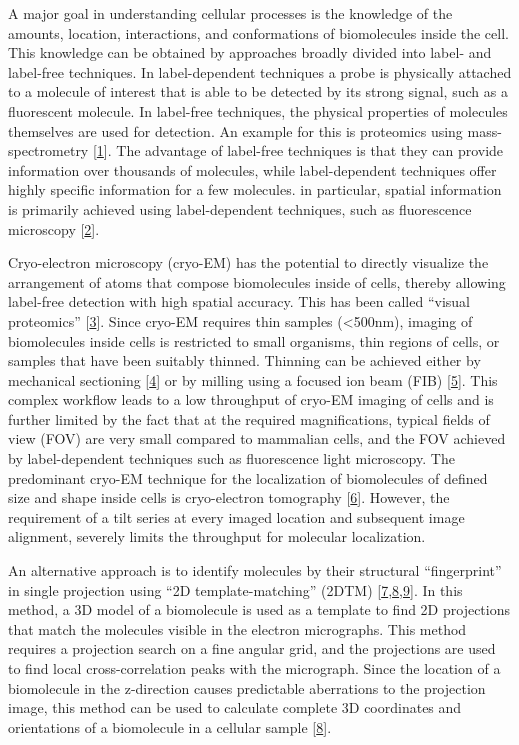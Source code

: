 \documentclass[
]{article}
\begin{document}
A major goal in understanding cellular processes is the knowledge of the
amounts, location, interactions, and conformations of biomolecules
inside the cell. This knowledge can be obtained by approaches broadly
divided into label- and label-free techniques. In label-dependent
techniques a probe is physically attached to a molecule of interest that
is able to be detected by its strong signal, such as a fluorescent
molecule. In label-free techniques, the physical properties of molecules
themselves are used for detection. An example for this is proteomics
using mass-spectrometry {[}\protect\hyperlink{ref-tSXIKPl7}{1}{]}. The advantage of
label-free techniques is that they can provide information over
thousands of molecules, while label-dependent techniques offer highly
specific information for a few molecules. in particular, spatial
information is primarily achieved using label-dependent techniques, such
as fluorescence microscopy {[}\protect\hyperlink{ref-VBmW7Aot}{2}{]}.

Cryo-electron microscopy (cryo-EM) has the potential to directly
visualize the arrangement of atoms that compose biomolecules inside of
cells, thereby allowing label-free detection with high spatial accuracy.
This has been called ``visual proteomics'' {[}\protect\hyperlink{ref-tGQ6TSUo}{3}{]}. Since
cryo-EM requires thin samples (\textless500nm), imaging of biomolecules inside
cells is restricted to small organisms, thin regions of cells, or
samples that have been suitably thinned. Thinning can be achieved either
by mechanical sectioning {[}\protect\hyperlink{ref-g8QavfwP}{4}{]} or by
milling using a focused ion beam (FIB) {[}\protect\hyperlink{ref-16IhS1Nc4}{5}{]}.
This complex workflow leads to a low throughput of cryo-EM imaging of
cells and is further limited by the fact that at the required
magnifications, typical fields of view (FOV) are very small compared to
mammalian cells, and the FOV achieved by label-dependent techniques such
as fluorescence light microscopy. The predominant cryo-EM technique for
the localization of biomolecules of defined size and shape inside cells
is cryo-electron tomography {[}\protect\hyperlink{ref-Rksh2dxu}{6}{]}. However,
the requirement of a tilt series at every imaged location and subsequent
image alignment, severely limits the throughput for molecular
localization.

An alternative approach is to identify molecules by their structural
``fingerprint'' in single projection using ``2D template-matching'' (2DTM)
{[}\protect\hyperlink{ref-Ynb3IP6I}{7},\protect\hyperlink{ref-18KGpXYPE}{8},\protect\hyperlink{ref-10bXZuF3G}{9}{]}.
In this method, a 3D model of a biomolecule is used as a template to
find 2D projections that match the molecules visible in the electron
micrographs. This method requires a projection search on a fine angular
grid, and the projections are used to find local cross-correlation peaks
with the micrograph. Since the location of a biomolecule in the
z-direction causes predictable aberrations to the projection image, this
method can be used to calculate complete 3D coordinates and orientations
of a biomolecule in a cellular sample {[}\protect\hyperlink{ref-18KGpXYPE}{8}{]}.
\end{document}
